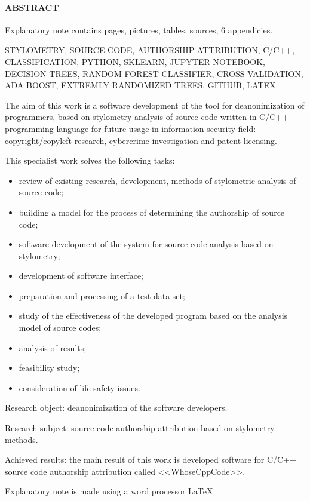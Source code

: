 \newpage
{}
\paragraph{\hfill ABSTRACT \hfill}
Explanatory note contains  pages,  pictures,  tables,
 sources, 6 appendicies.

STYLOMETRY, SOURCE CODE, AUTHORSHIP ATTRIBUTION, C/C++, CLASSIFICATION, PYTHON, SKLEARN,
JUPYTER NOTEBOOK, DECISION TREES, RANDOM FOREST CLASSIFIER, CROSS-VALIDATION, 
ADA BOOST, EXTREMLY RANDOMIZED TREES, GITHUB, LATEX.

The aim of this work is a software development of the tool for deanonimization of programmers, 
based on stylometry analysis of source code written in C/C++ programming language for future
usage in information security field: copyright/copyleft research, cybercrime investigation and patent licensing.

This specialist work solves the following tasks:
\begin{itemize}
  \item review of existing research, development, methods of stylometric analysis of source code;
  \item building a model for the process of determining the authorship of source code;
  \item software development of the system for source code analysis based on stylometry;
  \item development of software interface;
  \item preparation and processing of a test data set;
  \item study of the effectiveness of the developed program based on the analysis model of source codes;
  \item analysis of results;
  \item feasibility study;
  \item consideration of life safety issues.
\end{itemize}

Research object: deanonimization of the software developers.

Research subject: source code authorship attribution based on stylometry methods.

Achieved results: the main result of this work is developed software for C/C++ source code 
authorship attribution called <<WhoseCppCode>>.

Explanatory note is made using a word processor \LaTeX.
